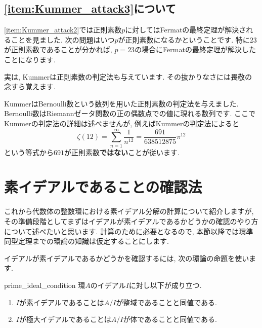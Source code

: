 \documentclass[11pt,b5paper,oneside,titlepage,lualatex]{ltjsreport}
\numberwithin{equation}{section} %
\begin{document}

\subsection{\ref{item:Kummer_attack3}について}


\ref{item:Kummer_attack2}では正則素数$ p $に対してはFermatの最終定理が解決されることを見ました. 
次の問題はいつ$ p $が正則素数になるかということです. 
特に$ 23 $が正則素数であることが分かれば, $ p=23 $の場合にFermatの最終定理が解決したことになります. 

実は, Kummerは正則素数の判定法も与えています. 
その抜かりなさには畏敬の念すら覚えます. 

KummerはBernoulli数という数列を用いた正則素数の判定法を与えました. 
Bernoulli数はRiemannゼータ関数の正の偶数点での値に現れる数列です. 
ここでKummerの判定法の詳細は述べませんが, 例えばKummerの判定法によると
\[
\zeta(12) = \sum_{n=1}^{\infty} \frac{1}{n^{12}} = \frac{691}{638512875} \pi^{12}
\]
という等式から$ 691 $が正則素数\textbf{ではない}ことが従います. 


\section{素イデアルであることの確認法} \label{sec:素イデアルであることの確認法}


これから代数体の整数環における素イデアル分解の計算について紹介しますが, その準備段階としてまずはイデアルが素イデアルであるかどうかの確認のやり方について述べたいと思います. 
計算のために必要となるので, 本節以降では環準同型定理までの環論の知識は仮定することにします. 

イデアルが素イデアルであるかどうかを確認するには, 次の環論の命題を使います. 

\begin{prop}{}{prime_ideal_condition}
	環$ A $のイデアル$ I $に対し以下が成り立つ. 
	\begin{enumerate}
		\item $ I $が素イデアルであることは$ A/I $が整域であることと同値である. 
		\item $ I $が極大イデアルであることは$ A/I $が体であることと同値である. 
	\end{enumerate}
\end{prop}
\end{document}
